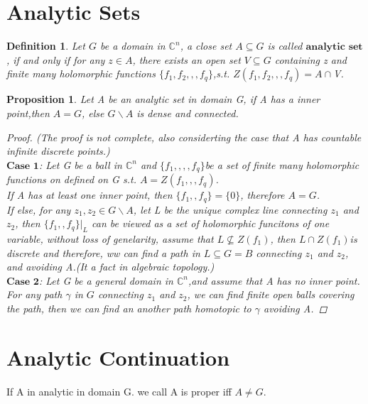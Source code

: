\documentclass[14pt,reqno]{amsart}
\newtheorem{prop}[thm]{Proposition}
\newtheorem{defi}[thm]{Definition}
\numberwithin{equation}{section}
\begin{document}
{\centering\section{Analytic Sets}}
		\begin{defi}\rm
			Let $G$ be a domain in $\mathbb{C}^{n}$, a close set  $A\subseteq G$ is called $\textbf{analytic set}$, if and only if for any $z\in A$, there exists an open set $V\subseteq G$ containing z and finite many holomorphic functions $\{f_{1},f_{2},,,f_{q}\}$,s.t. $Z(f_{1},f_{2},,,f_{q})=A\cap$V.
			\end{defi}
			\begin{prop}
				Let A be an analytic set in domain G, if A has a inner point,then $A=G$, else $G\backslash A$ is dense and connected.
				\begin{proof}
					(The proof is not complete, also considerting the case that A has countable infinite discrete points.)
					\\$\textbf{Case 1}$: Let G be a ball in $\mathbb{C}^{n}$ and $\{f_{1},,,, f_{q}\}$be a set of finite many holomorphic functions on defined on G s.t. $A=Z(f_{1},,,f_{q})$.
				\\If A has at least one inner point, then $\{f_{1},, f_{q}\}=\{0\}$, therefore $A=G$.
			\\If else, for any $z_{1},z_{2}\in G\backslash A$, let L be the unique complex line connecting $z_{1}$ and $z_{2}$, then $\{f_{1},, f_{q}\} |_{L}$ can be viewed as  a set of holomorphic funcitons of one variable, without loss of genelarity, assume that $L\nsubseteq Z(f_{1})$, then $L\cap Z(f_{1})$is discrete and therefore, ww can find a path in $L\subseteq G=B$ connecting $z_{1}$ and $z_{2}$, and avoiding A.(It a fact in algebraic topology.)
		\\$\textbf{Case 2}$: Let G be a general domain in $\mathbb{C}^{n}$,and assume that A has no inner point.\\
		For any path $\gamma$ in $G$ connecting $z_{1}$ and $z_{2}$, we can find finite open balls covering the path, then we can find an another path homotopic to $\gamma$ avoiding A.
		\end{proof} 
	\end{prop}
{\centering\section{Analytic Continuation}}	If A in analytic in domain G. we call A is proper iff $A\neq G$.
\end{document}
